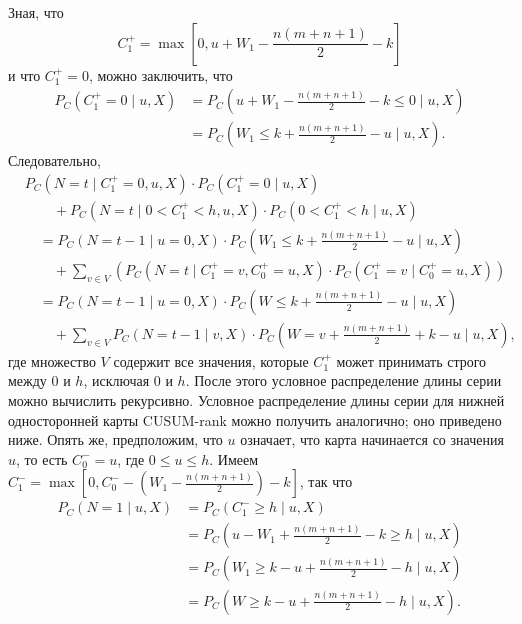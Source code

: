 Зная, что
\[
	C_1^+ = \max\left[ 0, u + W_1 - \frac{n(m + n + 1)}{2} - k \right]
\]
и что \(C_1^+ = 0\), можно заключить, что
\begin{align*}
	P_C\left( C_1^+ = 0 \mid u, X \right)
	&= P_C\left( u + W_1 - \frac{n(m + n + 1)}{2} - k \le 0 \mid u, X \right) \\
	&= P_C\left( W_1 \le k + \frac{n(m + n + 1)}{2} - u \mid u, X \right).
\end{align*}
Следовательно,
\begin{align*}
	&P_C\left( N = t \mid C_1^+ = 0, u, X \right)\cdot P_C\left( C_1^+ = 0 \mid u, X \right) \\
	&\qquad + P_C\left( N = t \mid 0 < C_1^+ < h, u, X \right)\cdot P_C\left( 0 < C_1^+ < h \mid u, X \right) \\
	&\quad = P_C\left( N = t - 1 \mid u = 0, X \right)\cdot P_C\left( W_1 \le k + \frac{n(m + n + 1)}{2} - u \mid u, X \right) \\
	&\qquad + \sum_{v \in V}\left( P_C\left( N = t \mid C_1^+ = v, C_0^+ = u, X \right)\cdot P_C\left( C_1^+ = v \mid C_0^+ = u, X \right) \right) \\
	&\quad = P_C\left( N = t - 1 \mid u = 0, X \right)\cdot P_C\left( W \le k + \frac{n(m + n + 1)}{2} - u \mid u, X \right) \\
	&\qquad + \sum_{v \in V} P_C\left( N = t - 1 \mid v, X \right)\cdot P_C\left( W = v + \frac{n(m + n + 1)}{2} + k - u \mid u, X \right),
\end{align*}
где множество \(V\) содержит все значения, которые \(C_1^+\) может принимать строго между 0 и \(h\), исключая 0 и \(h\). После этого условное распределение длины серии можно вычислить рекурсивно. Условное распределение длины серии для нижней односторонней карты CUSUM-rank можно получить аналогично; оно приведено ниже. Опять же, предположим, что \(u\) означает, что карта начинается со значения \(u\), то есть \(C_0^- = u\), где \(0 \le u \le h\). Имеем \(C_1^- = \max\left[ 0, C_0^- - \left( W_1 - \frac{n(m + n + 1)}{2} \right) - k \right]\), так что
\begin{align*}
	P_C\left( N = 1 \mid u, X \right)
	&= P_C\left( C_1^- \ge h \mid u, X \right) \\
	&= P_C\left( u - W_1 + \frac{n(m + n + 1)}{2} - k \ge h \mid u, X \right) \\
	&= P_C\left( W_1 \ge k - u + \frac{n(m + n + 1)}{2} - h \mid u, X \right) \\
	&= P_C\left( W \ge k - u + \frac{n(m + n + 1)}{2} - h \mid u, X \right).
\end{align*}
